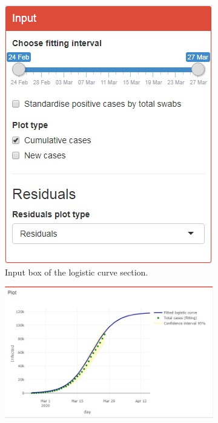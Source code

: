 \documentclass[
12pt, %
a4paper, %
oneside, %
headinclude,footinclude, %
BCOR5mm, %
]{scrartcl}
\begin{document}
\begin{figure}[H]
  \centering
\begin{subfigure}{0.6\textwidth}
  \includegraphics[width=1\linewidth]{Figures/logistic_input.png} 
  \caption{Input box of the logistic curve section.}
  \label{fig:logistic_input}
\end{subfigure} 
\hspace{5.5cm}
\begin{subfigure}{0.6\textwidth}
  \includegraphics[width=1\linewidth]{Figures/logistic_plot1.png} 

\end{subfigure}
\end{figure}
\end{document}
